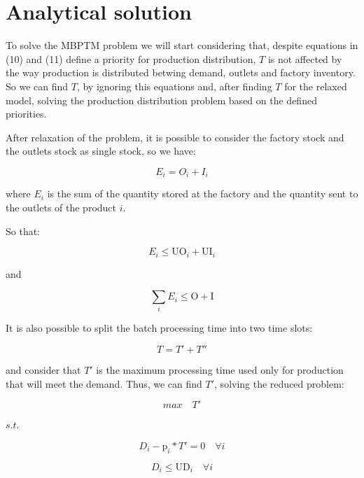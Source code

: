 \documentclass[authoryear,manuscript,12pt]{elsarticle}
\begin{document}
\section{Analytical solution}
\label{sec:analyticalSol}

To solve the MBPTM problem we will start considering that, despite equations in (10) and (11) define a priority for production distribution, $T$ is not affected by the way production is distributed betwing demand, outlets and factory inventory. So we can find $T$, by ignoring this equations and, after finding $T$ for the relaxed model, solving the production distribution problem based on the defined priorities.

After relaxation of the problem, it is possible to consider the factory stock and the outlets stock as single stock, so we have:

\begin{equation}
E_i = O_i + I_i
\end{equation}

where $E_i$ is the sum of the quantity stored at the factory and the quantity sent to the outlets of the product $i$.

So that:

\begin{equation}
E_i \leq \textrm{UO}_i + \textrm{UI}_i
\end{equation}

and

\begin{equation}
\sum_i {E_i} \leq \textrm{O} + \textrm{I}
\end{equation}


It is also possible to split the batch processing time into two time slots:

\begin{equation}
T = T' + T''
\end{equation}

and consider that $T'$ is the maximum processing time used only for production that will meet the demand. Thus, we can find $T'$, solving the reduced problem:

\begin{equation}
max \quad T'
\end{equation}

$s.t.$

\begin{equation}
D_i - \textrm{p}_i * T'  = 0 \quad \forall i
\end{equation}

\begin{equation}
D_i \leq \textrm{UD}_i \quad \forall i
\end{equation}
\end{document}
